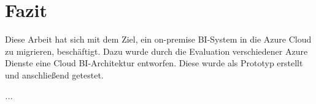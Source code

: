 \chapter{Fazit} \label{ch:zusammenfassung}
Diese Arbeit hat sich mit dem Ziel, ein on-premise BI-System in die Azure Cloud zu migrieren, beschäftigt. Dazu wurde durch die Evaluation verschiedener Azure Dienste eine Cloud BI-Architektur entworfen. Diese wurde als Prototyp erstellt und anschließend getestet.

\textit{...}

